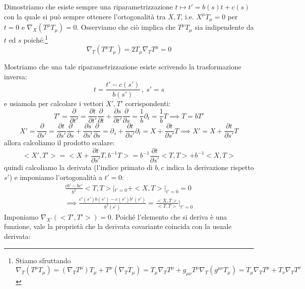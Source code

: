 Dimostriamo che esiste sempre una riparametrizzazione $t \mapsto t' = b(s)t + c(s)$ con la quale si può sempre ottenere l'ortogonalità tra $X, T$, i.e. $X^\mu T_\mu = 0$ per $t=0$ e $\nabla_X(T^\mu T_\mu) = 0$. Osserviamo che ciò implica che $T^\mu T_\mu$ sia indipendente da $t$ ed $s$ poiché:\footnote{Stiamo sfruttando $\nabla_T(T^\mu T_\mu) = (\nabla_T T^\mu)T_\mu + T^\mu(\nabla_T T_\mu) = T_\mu \nabla_T T^\mu + g_{\mu\nu}T^\mu \nabla_T( g^{\mu\nu}T_\mu) = T_\mu \nabla_T T^\mu + T_\nu \nabla_T T^\nu$}
\begin{equation*}
    \nabla_T (T^\mu T_\mu) = 2 T_\mu \nabla_T T^\mu = 0
\end{equation*}

Mostriamo che una tale riparametrizzazione esiste scrivendo la trasformazione inversa:
\begin{equation*}
    t = \frac{t' - c(s')}{b(s')} \ ,  \ s'=s
\end{equation*}
e usiamola per calcolare i vettori $X', T'$ corrispondenti:
\begin{equation*}
    T' = \frac{\partial}{\partial t'} = \frac{\partial t}{\partial t'} \frac{\partial}{\partial t} + \frac{\partial s}{\partial t'} \frac{\partial}{\partial s} = \frac{1}{b}\partial_t = \frac{1}{b} T \implies T= b T'
\end{equation*}
\begin{equation*}
    X' = \frac{\partial}{\partial s'} = \frac{\partial t}{\partial s'} \frac{\partial}{\partial s} + \frac{\partial s}{\partial s'} \frac{\partial}{\partial s} =  \partial_s + \frac{\partial t}{\partial s'} \partial_t = X + \frac{\partial t}{\partial s'} T \implies X' = X + \frac{\partial t}{\partial s'} T
\end{equation*}
allora calcoliamo il prodotto scalare:
\begin{equation*}
    < X', T' > = < X + \frac{\partial t}{\partial s'} T , b^{-1} T > = b^{-1}\frac{\partial t}{\partial s'} <T,T> + b^{-1}<X, T >
\end{equation*}
quindi calcoliamo la derivata (l'indice primato di $b, c$ indica la derivazione rispetto $s'$) e imponiamo l'ortogonalità a $t'=0$:
\begin{align*}
    \frac{cb'-bc'}{b^2}<T,T>|_{t'=0} + <X, T>|_{t'=0} = 0 \\
    \implies \frac{c'(s')b(s') -c(s')b'(s')}{b^2(s')} = \frac{<X,T>}{<T,T>}\big|_{t'=0}
\end{align*}
Imponiamo $\nabla_{X'}(<T',T'>) = 0$. Poiché l'elemento che si deriva è una funzione, vale la proprietà che la derivata covariante coincida con la usuale derivata:
